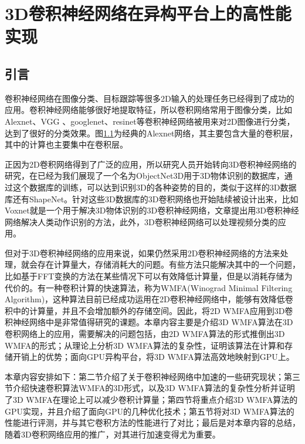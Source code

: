 \chapter{3D卷积神经网络在异构平台上的高性能实现}
\label{3DWinograd}
\section{引言}
卷积神经网络在图像分类、目标跟踪等很多2D输入的处理任务已经得到了成功的应用。卷积神经网络能够很好地提取特征，所以卷积网络常用于图像分类，比如Alexnet、VGG 、googlenet、resinet等卷积神经网络被用来对2D图像进行分类，达到了很好的分类效果。图\ref{}为经典的Alexnet网络，其主要包含大量的卷积层，其中的计算也主要集中在卷积层。

正因为2D卷积网络得到了广泛的应用，所以研究人员开始转向3D卷积神经网络的研究，在已经为我们展现了一个名为ObjectNet3D用于3D物体识别的数据库，通过这个数据库的训练，可以达到识别3D的各种姿势的目的，类似于这样的3D数据库还有ShapeNet。针对这些3D数据库的3D卷积网络也开始陆续被设计出来，比如Voxnet就是一个用于解决3D物体识别的3D卷积神经网络，文章提出用3D卷积神经网络解决人类动作识别的方法，此外，3D卷积神经网络可以处理视频分类的应用\upcite{}。

但对于3D卷积神经网络的应用来说，如果仍然采用2D卷积神经网络的方法来处理，就会存在计算量大，存储消耗大的问题。有些方法只能解决其中的一个问题，比如基于FFT变换的方法在某些情况下可以有效降低计算量，但是以消耗存储为代价的。有一种卷积计算的快速算法，称为WMFA(Winograd Minimal Filtering Algorithm)，这种算法目前已经成功运用在2D卷积神经网络中，能够有效降低卷积中的计算量，并且不会增加额外的存储空间。因此，将2D WMFA应用到3D卷积神经网络中是非常值得研究的课题。本章内容主要是介绍3D WMFA算法在3D卷积网络上的应用，需要解决的问题包括，由2D WMFA算法的形式推倒出3D WMFA的形式；从理论上分析3D WMFA算法的复杂性，证明该算法在计算和存储开销上的优势；面向GPU异构平台，将3D WMFA算法高效地映射到GPU上。

本章内容安排如下：第二节介绍了关于卷积神经网络中加速的一些研究现状；第三节介绍快速卷积算法WMFA的3D形式，以及3D WMFA算法的复杂性分析并证明了3D WMFA在理论上可以减少卷积计算量；第四节将重点介绍3D WMFA算法的GPU实现，并且介绍了面向GPU的几种优化技术；第五节将对3D WMFA算法的性能进行评测，并与其它卷积方法的性能进行了对比；最后是对本章内容的总结，随着3D卷积网络应用的推广，对其进行加速变得尤为重要。

